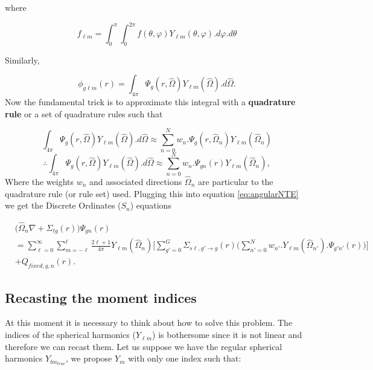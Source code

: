 \documentclass[11pt,letterpaper,titlepage]{article}
\numberwithin{equation}{section}
\begin{document}
\noindent where

$$f_{\ell m} = \int_0^\pi \int_0^{2\pi} f(\theta,\varphi) Y_{\ell m}(\theta,\varphi)    .d\varphi.d\theta$$

\noindent Similarly,

\begin{equation*}
\phi_{g\ell m}(r) = \int_{4\pi} \Psi_g(r,\hat{\Omega}) Y_{\ell m}(\hat{\Omega}).d\hat{\Omega}.
\end{equation*}
\newline
\noindent Now the fundamental trick is to approximate this integral with a \textbf{quadrature rule} or a set of quadrature rules such that

\begin{equation*}
\int_{4\pi} \Psi_g(r,\hat{\Omega}) Y_{\ell m}(\hat{\Omega}).d\hat{\Omega} \approx \sum_{n=0}^{N} w_n . \Psi_g(r,\hat{\Omega}_n) Y_{\ell m}(\hat{\Omega}_n)
\end{equation*}
\begin{equation}
\therefore 
\int_{4\pi} \Psi_g(r,\hat{\Omega}) Y_{\ell m}(\hat{\Omega}).d\hat{\Omega} \approx \sum_{n=0}^{N} w_n . \Psi_{gn}(r) Y_{\ell m}(\hat{\Omega}_n),
\end{equation}
\newline
Where the weights $w_n$ and associated directions $\hat{\Omega}_n$ are particular to the quadrature rule (or rule set) used.
Plugging this into equation \ref{eq:angularNTE} we get the Discrete Ordinates ($S_n$) equations

\begin{equation} \label{eq:SNequations}
\begin{aligned}
&\biggr(\hat{\Omega}_n\nabla +\Sigma_{tg} (r)\biggr)  \Psi_{gn} (r)\\
&= \sum_{\ell=0}^{\infty}\sum_{m=-\ell}^{\ell} \frac{2\ell+1}{4\pi}Y_{\ell m}(\hat{\Omega}_n)
\biggr[ \sum_{g'=0}^{G}
\Sigma_{s\ell,g'{\to}g} (r)
\biggr(
\sum_{n'=0}^{N} w_{n'} . Y_{\ell m}(\hat{\Omega}_{n'}).\Psi_{g'n'}(r) 
\biggr)
\biggr]\\
&+  Q_{fixed,g,n} (r).
\end{aligned}
\end{equation}



\vspace{1cm}
\subsection{Recasting the moment indices}
At this moment it is necessary to think about how to solve this problem. The indices of the spherical harmonics ($Y_{\ell m}$) is bothersome since it is not linear and therefore we can recast them. Let us suppose we have the regular spherical harmonics $Y_{lm_{true}}$, we propose $Y_{m}$ with only one index such that:
\end{document}
